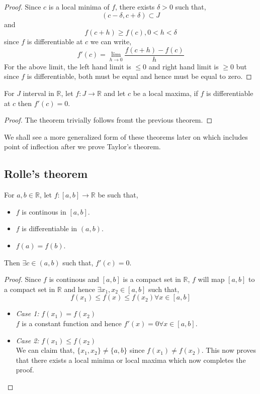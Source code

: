 \documentclass[11pt,a4paper]{colorart}
\def\d{{\delta}}
\def\R{\mathbb{R}}
\def\ra{\rightarrow}
\begin{document}
\begin{proof}
	Since $c$ is a local minima of $f$, there exists $\d >0$ such that,
	\[ (c-\d,c+\d) \subset J \]
	and
	\[ f(c+h) \geq f(c), 0<h<\d \]
	since $f$ is differentiable at $c$ we can write,
	\[ f'(c) =  \lim_{ h \to 0 } \frac{ f(c+h) - f(c) }{ h } \]
	For the above limit, the left hand limit is $\leq 0$ and right hand limit is $\geq 0$ but since $f$ is differentiable, both must be equal and hence must be equal to zero.
\end{proof}

\begin{theorem}
	For $J$ interval in $\R$, let $f:J\ra\R$ and let $c$ be a local maxima, if $f$ is differentiable at $c$ then $f'(c)=0$.
\end{theorem}

\begin{proof}
	The theorem trivially follows fromt the previous theorem.
\end{proof}

We shall see a more generalized form of these theorems later on which includes point of inflection after we prove Taylor's theorem.

\subsection{Rolle's theorem}

\begin{theorem}
	For $a,b \in \R$, let $f:[a,b] \ra \R$ be such that,
	\begin{itemize}
		\item $f$ is continous in $[a,b]$.
		\item $f$ is differentiable in $(a,b)$.
		\item $f(a)=f(b)$.
	\end{itemize}
	Then $\exists c \in (a,b)$ such that, $f'(c) = 0$.
\end{theorem}

\begin{proof}
	Since $f$ is continous and $[a,b]$ is a compact set in $\R$, $f$ will map $[a,b]$ to a compact set in $\R$ and hence $\exists x_1,x_2 \in [a,b]$ such that,
	\[ f(x_1) \leq f(x) \leq f(x_2) \forall x \in [a,b] \]

	\begin{itemize}
		\item \textit{Case 1:} $f(x_1) = f(x_2) $\\
			$f$ is a constant function and hence $f'(x) = 0 \forall x \in [a,b]$.
		\item \textit{Case 2:} $f(x_1) \leq f(x_2)$\\
			We can claim that, $\{x_1,x_2\} \neq \{a,b\}$ since $f(x_1)\neq f(x_2)$. This now proves that there exists a local minima or local maxima which now completes the proof.
	\end{itemize}
\end{proof}
\end{document}
